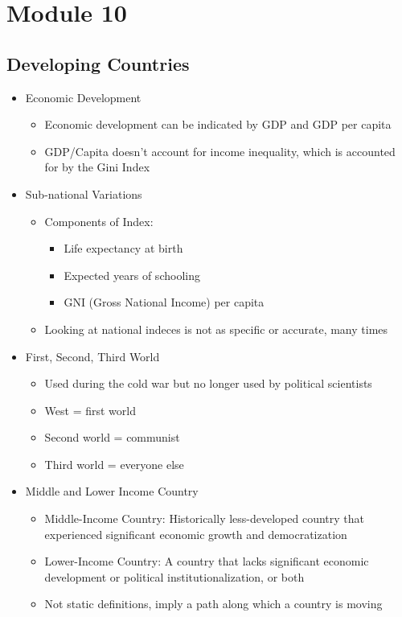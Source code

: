 \documentclass[11pt]{article}
\begin{document}
\section{Module 10}
\label{sec:org54be16d}
\subsection{Developing Countries}
\label{sec:org27353de}
\begin{itemize}
\item Economic Development
\begin{itemize}
\item Economic development can be indicated by GDP and GDP per capita
\item GDP/Capita doesn't account for income inequality, which is accounted for by the Gini Index
\end{itemize}
\item Sub-national Variations
\begin{itemize}
\item Components of Index:
\begin{itemize}
\item Life expectancy at birth
\item Expected years of schooling
\item GNI (Gross National Income) per capita
\end{itemize}
\item Looking at national indeces is not as specific or accurate, many times
\end{itemize}
\item First, Second, Third World
\begin{itemize}
\item Used during the cold war but no longer used by political scientists
\item West = first world
\item Second world = communist
\item Third world = everyone else
\end{itemize}
\item Middle and Lower Income Country
\begin{itemize}
\item Middle-Income Country: Historically less-developed country that experienced significant economic growth and democratization
\item Lower-Income Country: A country that lacks significant economic development or political institutionalization, or both
\item Not static definitions, imply a path along which a country is moving

\end{itemize}
\end{itemize}
\end{document}
